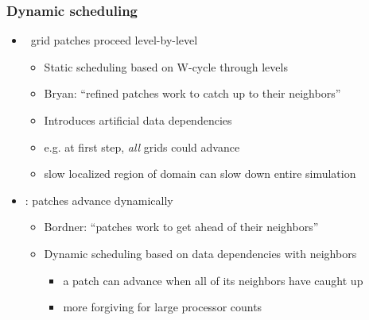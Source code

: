 \begin{frame}[fragile] 
\frametitle{Dynamic scheduling}
\begin{itemize}
\item\enzo\ grid patches proceed level-by-level
\begin{itemize}
\item   Static scheduling based on W-cycle through levels
\item   Bryan: ``refined patches work to catch up to their neighbors''
\item   Introduces artificial data dependencies
\end{itemize}
\begin{itemize}
\item      e.g. at first step, \textit{all} grids could advance
\item      slow localized region of domain can slow down entire simulation
\end{itemize}
\item\cello: patches advance dynamically
\begin{itemize}
\item   Bordner: ``patches work to get ahead of their neighbors''
\item   Dynamic scheduling based on data dependencies with neighbors
\begin{itemize}
\item     a patch can advance when all of its neighbors have caught up
\item     more forgiving for large processor counts
\end{itemize}
\end{itemize}
\end{itemize}
\end{frame}
